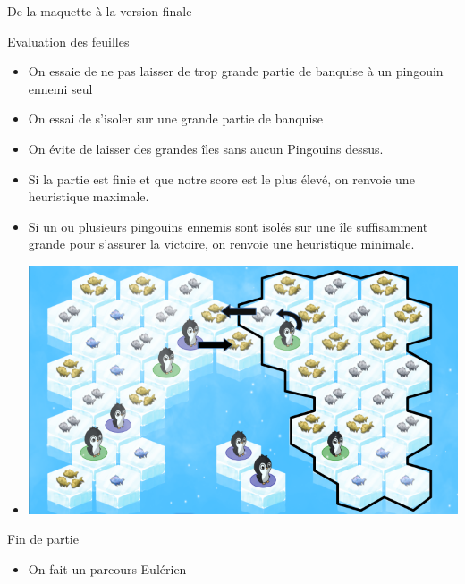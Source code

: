 \documentclass{beamer}
\begin{document}
\begin{frame}{De la maquette à la version finale}
\begin{frame}{}
\begin{block}{Evaluation des feuilles}
\begin{itemize}
 \item<1-> On essaie de ne pas laisser de trop grande partie de banquise à un pingouin ennemi seul
 \item<2-> On essai de s'isoler sur une grande partie de banquise
 \item<3-> On évite de laisser des grandes îles sans aucun Pingouins dessus.
 \item<4-> Si la partie est finie et que notre score est le plus élevé, on renvoie 
une heuristique maximale.
 \item<5-> Si un ou plusieurs pingouins ennemis sont isolés sur une île suffisamment grande pour s'assurer la victoire, on renvoie une heuristique minimale.
\end{itemize}
\end{block}
\end{frame}

\begin{frame}{}
\begin{block}{}
\begin{itemize}
 \item{ \includegraphics[scale=0.4]{IA9}}
\end{itemize}
\end{block}
\end{frame}

\begin{frame}{}
\begin{block}{Fin de partie}
\begin{itemize}
  \item{On fait un parcours Eulérien}
\end{itemize}
\end{block}
\end{frame}



\end{frame}
\end{document}
